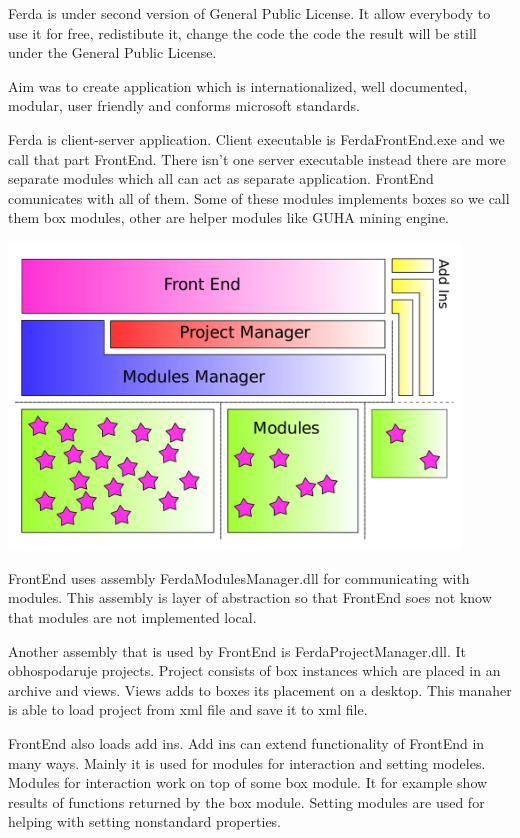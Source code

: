 \documentclass{article}
\begin{document}
Ferda is under second version of General Public License. It allow everybody to use it for free, redistibute it, change the code the code the result will be still under the General Public License.

Aim was to create application which is internationalized, well documented, modular, user friendly and conforms microsoft standards.

Ferda is client-server application. Client executable is FerdaFrontEnd.exe and we call that part FrontEnd. There isn't one server executable instead there are more separate modules which all can act as separate application. FrontEnd comunicates with all of them. Some of these modules implements boxes so we call them box modules, other are helper modules like GUHA mining engine.

\noindent\includegraphics[width=12cm]{designB}

FrontEnd uses assembly FerdaModulesManager.dll for communicating with modules. This assembly is layer of abstraction so that FrontEnd soes not know that modules are not implemented local.

Another assembly that is used by FrontEnd is FerdaProjectManager.dll. It obhospodaruje projects. Project consists of box instances which are placed in an archive and views. Views adds to boxes its placement on a desktop. This manaher is able to load project from xml file and save it to xml file.

FrontEnd also loads add ins. Add ins can extend functionality of FrontEnd in many ways. Mainly it is used for modules for interaction and setting modeles. Modules for interaction work on top of some box module. It for example show results of functions returned by the box module. Setting modules are used for helping with setting nonstandard properties.
\end{document}
